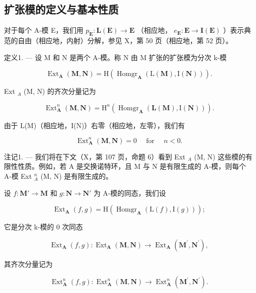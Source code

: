 \subsection{扩张模的定义与基本性质}

对于每个 A-模 E，我们用 \(p_{\mathbf{E}} : \mathbf{L}(\mathbf{E}) \to \mathbf{E}\) （相应地， \(e_{\mathbf{E}} : \mathbf{E} \to \mathbf{I}(\mathbf{E})\) ）表示典范的自由（相应地，内射）分解，参见 X，第 50 页（相应地，第 52 页）。

定义1. --- 设 M 和 N 是两个 A-模。称 N 由 M 扩张的扩张模为分次 k-模

\[
\operatorname{Ext} _ {\mathbf {A}} (\mathbf {M}, \mathbf {N}) = \mathrm{H} \left(\operatorname{Homgr} _ {\mathbf {A}} (\mathrm{L} (\mathbf {M}), \mathrm{I} (\mathbf {N}))\right).\tag{4}
\]

Ext \(_{A}\) (M, N) 的齐次分量记为

\[
\operatorname{Ext} _ {\mathbf {A}} ^ {n} (\mathbf {M}, \mathbf {N}) = \mathrm{H} ^ {n} \left(\operatorname{Homgr} _ {\mathbf {A}} (\mathbf {L} (\mathbf {M}), \mathrm{I} (\mathbf {N}))\right).\tag{5}
\]

由于 L(M)（相应地，I(N)）右零（相应地，左零），我们有

\[
\operatorname{Ext} _ {\mathbf {A}} ^ {n} (\mathbf {M}, \mathbf {N}) = 0 \quad \text { for } \quad n <   0.\tag{6}
\]

注记1. --- 我们将在下文（X，第 107 页，命题 6）看到 Ext \(_{A}\) (M, N) 这些模的有限性性质。例如，若 A 是交换诺特环，且 M 与 N 是有限生成的 A-模，则每个 A-模 Ext \(_{A}^{n}\) (M, N) 是有限生成的。

设 \(f: \mathbf{M}' \to \mathbf{M}\) 和 \(g: \mathbf{N} \to \mathbf{N}'\) 为 A-模的同态，我们设

\[
\operatorname{Ext} _ {\mathbf {A}} (f, g) = \mathrm{H} \left(\operatorname{Homgr} _ {\mathbf {A}} (\mathrm{L} (f), \mathrm{I} (g))\right);
\]

它是分次 k-模的 0 次同态

\[
\operatorname{Ext} _ {\mathbf {A}} (f, g): \operatorname{Ext} _ {\mathbf {A}} (\mathbf {M}, \mathbf {N}) \rightarrow \operatorname{Ext} _ {\mathbf {A}} \left(\mathbf {M} ^ {\prime}, \mathbf {N} ^ {\prime}\right),
\]

其齐次分量记为

\[
\operatorname{Ext} _ {\mathbf {A}} ^ {n} (f, g): \operatorname{Ext} _ {\mathbf {A}} ^ {n} (\mathbf {M}, \mathbf {N}) \rightarrow \operatorname{Ext} _ {\mathbf {A}} ^ {n} \left(\mathbf {M} ^ {\prime}, \mathbf {N} ^ {\prime}\right).
\]

